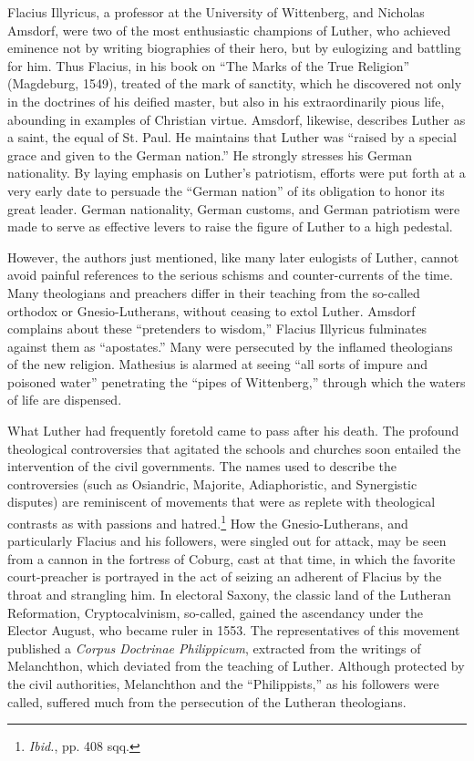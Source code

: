 Flacius Illyricus, a professor at the University of Wittenberg, and
Nicholas Amsdorf, were two of the most enthusiastic champions of
Luther, who achieved eminence not by writing biographies of their
hero, but by eulogizing and battling for him. Thus Flacius, in his
book on “The Marks of the True Religion” (Magdeburg, 1549),
treated of the mark of sanctity, which he discovered not only in the
doctrines of his deified master, but also in his extraordinarily pious
life, abounding in examples of Christian virtue. Amsdorf, likewise, describes
Luther as a saint, the equal of St. Paul. He maintains
that Luther was “raised by a special grace and given to the German
nation.” He strongly stresses his German nationality. By laying emphasis
on Luther’s patriotism, efforts were put forth at a very early
date to persuade the “German nation” of its obligation to honor its
great leader. German nationality, German customs, and German patriotism
were made to serve as effective levers to raise the figure of
Luther to a high pedestal.

However, the authors just mentioned, like many later eulogists of
Luther, cannot avoid painful references to the serious schisms and
counter-currents of the time. Many theologians and preachers differ
in their teaching from the so-called orthodox or Gnesio-Lutherans,
without ceasing to extol Luther. Amsdorf complains about these
“pretenders to wisdom,” Flacius Illyricus fulminates against them as
“apostates.” Many were persecuted by the inflamed theologians of
the new religion. Mathesius is alarmed at seeing “all sorts of impure
and poisoned water” penetrating the “pipes of Wittenberg,” through
which the waters of life are dispensed.

What Luther had frequently foretold came to pass after his death.
The profound theological controversies that agitated the schools and
churches soon entailed the intervention of the civil governments.
The names used to describe the controversies (such as Osiandric,
Majorite, Adiaphoristic, and Synergistic disputes) are reminiscent of
movements that were as replete with theological contrasts as with
passions and hatred.\footnote{\textit{Ibid.}, pp. 408 sqq.}
How the Gnesio-Lutherans, and particularly
Flacius and his followers, were singled out for attack, may be seen
from a cannon in the fortress of Coburg, cast at that time, in which
the favorite court-preacher is portrayed in the act of seizing an adherent
of Flacius by the throat and strangling him. In electoral Saxony, the
classic land of the Lutheran Reformation, Cryptocalvinism,
so-called, gained the ascendancy under the Elector August, who became
ruler in 1553. The representatives of this movement published
a \textit{Corpus Doctrinae Philippicum}, extracted from the writings of Melanchthon,
which deviated from the teaching of Luther. Although
protected by the civil authorities, Melanchthon and the “Philippists,”
as his followers were called, suffered much from the persecution of the
Lutheran theologians.

